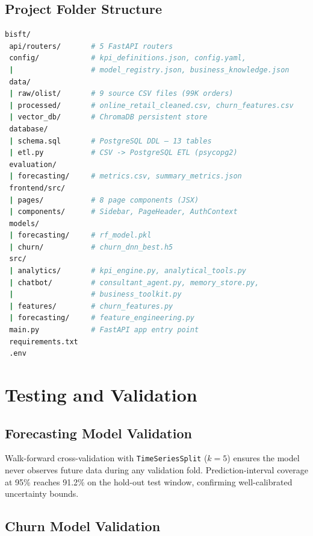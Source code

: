 \documentclass[conference]{IEEEtran}
\begin{document}
\subsection{Project Folder Structure}

\begin{lstlisting}[language=bash, basicstyle=\ttfamily\tiny, numbers=none,
  frame=single, framerule=0.4pt, rulecolor=\color{gray!40},
  backgroundcolor=\color{codeBack}]
bisft/
 api/routers/       # 5 FastAPI routers
 config/            # kpi_definitions.json, config.yaml,
 |                  # model_registry.json, business_knowledge.json
 data/
 | raw/olist/       # 9 source CSV files (99K orders)
 | processed/       # online_retail_cleaned.csv, churn_features.csv
 | vector_db/       # ChromaDB persistent store
 database/
 | schema.sql       # PostgreSQL DDL — 13 tables
 | etl.py           # CSV -> PostgreSQL ETL (psycopg2)
 evaluation/
 | forecasting/     # metrics.csv, summary_metrics.json
 frontend/src/
 | pages/           # 8 page components (JSX)
 | components/      # Sidebar, PageHeader, AuthContext
 models/
 | forecasting/     # rf_model.pkl
 | churn/           # churn_dnn_best.h5
 src/
 | analytics/       # kpi_engine.py, analytical_tools.py
 | chatbot/         # consultant_agent.py, memory_store.py,
 |                  # business_toolkit.py
 | features/        # churn_features.py
 | forecasting/     # feature_engineering.py
 main.py            # FastAPI app entry point
 requirements.txt
 .env
\end{lstlisting}

\section{Testing and Validation}

\subsection{Forecasting Model Validation}

Walk-forward cross-validation with \texttt{TimeSeriesSplit} ($k\!=\!5$) ensures
the model never observes future data during any validation fold.  Prediction-interval
coverage at 95\% reaches 91.2\% on the hold-out test window, confirming
well-calibrated uncertainty bounds.

\subsection{Churn Model Validation}
\end{document}

